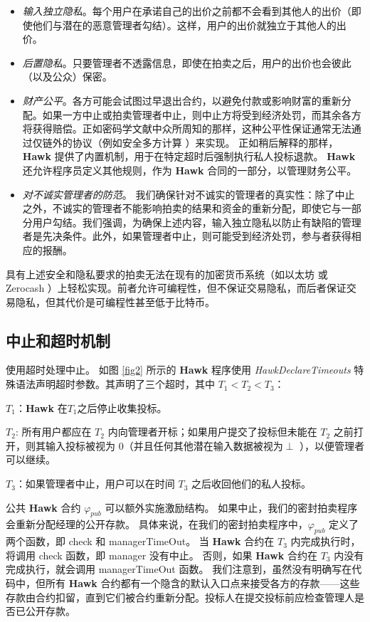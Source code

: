 \documentclass{xduugtrans}
\begin{document}
\begin{itemize}
    \item \textit{输入独立隐私}。每个用户在承诺自己的出价之前都不会看到其他人的出价（即使他们与潜在的恶意管理者勾结）。这样，用户的出价就独立于其他人的出价。
    \item \textit{后置隐私}。只要管理者不透露信息，即使在拍卖之后，用户的出价也会彼此（以及公众）保密。
    \item \textit{财产公平}。各方可能会试图过早退出合约，以避免付款或影响财富的重新分配。如果一方中止或拍卖管理者中止，则中止方将受到经济处罚，而其余各方将获得赔偿。正如密码学文献中众所周知的那样，这种公平性保证通常无法通过仅链外的协议（例如安全多方计算 \cite{ref7}\cite{ref17}）来实现。 正如稍后解释的那样，\textbf{Hawk} 提供了内置机制，用于在特定超时后强制执行私人投标退款。 \textbf{Hawk} 还允许程序员定义其他规则，作为 \textbf{Hawk} 合同的一部分，以管理财务公平。
    \item \textit{对不诚实管理者的防范}。 我们确保针对不诚实的管理者的真实性：除了中止之外，不诚实的管理者不能影响拍卖的结果和资金的重新分配，即使它与一部分用户勾结。我们强调，为确保上述内容，输入独立隐私以防止有缺陷的管理者是先决条件。此外，如果管理者中止，则可能受到经济处罚，参与者获得相应的报酬。
\end{itemize}

具有上述安全和隐私要求的拍卖无法在现有的加密货币系统（如以太坊 \cite{ref57} 或 Zerocash \cite{ref11}）上轻松实现。前者允许可编程性，但不保证交易隐私，而后者保证交易隐私，但其代价是可编程性甚至低于比特币。

\subsection{中止和超时机制}

使用超时处理中止。 如图 \ref{fig2} 所示的 \textbf{Hawk} 程序使用 \textsl{HawkDeclareTimeouts} 特殊语法声明超时参数。其声明了三个超时，其中 $T_1 < T_2 < T_3$：

$T_1$：\textbf{Hawk} 在$T_1$之后停止收集投标。

$T_2$: 所有用户都应在 $T_2$ 内向管理者开标；如果用户提交了投标但未能在 $T_2$ 之前打开，则其输入投标被视为 0（并且任何其他潜在输入数据被视为$\perp$ ），以便管理者可以继续。

$T_3$：如果管理者中止，用户可以在时间 $T_3$ 之后收回他们的私人投标。

公共 \textbf{Hawk} 合约 $\varphi  _{pub}$ 可以额外实施激励结构。 如果中止，我们的密封拍卖程序会重新分配经理的公开存款。 具体来说，在我们的密封拍卖程序中，$\varphi  _{pub}$ 定义了两个函数，即 check 和 managerTimeOut。 当 \textbf{Hawk} 合约在 $T_3$ 内完成执行时，将调用 check 函数，即 manager 没有中止。 否则，如果 \textbf{Hawk} 合约在 $T_3$ 内没有完成执行，就会调用 managerTimeOut 函数。 我们注意到，虽然没有明确写在代码中，但所有 \textbf{Hawk} 合约都有一个隐含的默认入口点来接受各方的存款——这些存款由合约扣留，直到它们被合约重新分配。投标人在提交投标前应检查管理人是否已公开存款。
\end{document}
